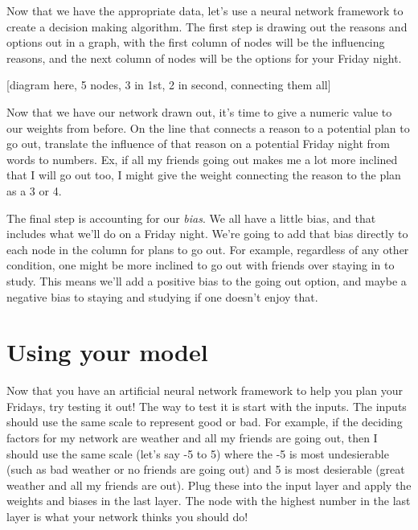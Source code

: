 \documentclass[11pt]{article}
\begin{document}
Now that we have the appropriate data, let's use a neural network framework to create a decision making algorithm. The
first step is drawing out the reasons and options out in a graph, with the first column of nodes will be the influencing
reasons, and the next column of nodes will be the options for your Friday night.


[diagram here, 5 nodes, 3 in 1st, 2 in second, connecting them all]


Now that we have our network drawn out, it's time to give a numeric value to our weights from before. On the line that
connects a reason to a potential plan to go out, translate the influence of that reason on a potential Friday night from
words to numbers. Ex, if all my friends going out makes me a lot more inclined that I will go out too, I might give the
weight connecting the reason to the plan as a 3 or 4.

The final step is accounting for our \emph{bias}. We all have a little bias, and that includes what we'll do on a Friday
night. We're going to add that bias directly to each node in the column for plans to go out. For example, regardless of
any other condition, one might be more inclined to go out with friends over staying in to study. This means we'll add a
positive bias to the going out option, and maybe a negative bias to staying and studying if one doesn't enjoy that.

\section*{Using your model}

Now that you have an artificial neural network framework to help you plan your Fridays, try testing it out! The way to
test it is start with the inputs. The inputs should use the same scale to represent good or bad. For example, if the
deciding factors for my network are weather and all my friends are going out, then I should use the same scale (let's
say -5 to 5) where the -5 is most undesierable (such as bad weather or no friends are going out) and 5 is most
desierable (great weather and all my friends are out). Plug these into the input layer and apply the weights and biases
in the last layer. The node with the highest number in the last layer is what your network thinks you should do!
\end{document}
